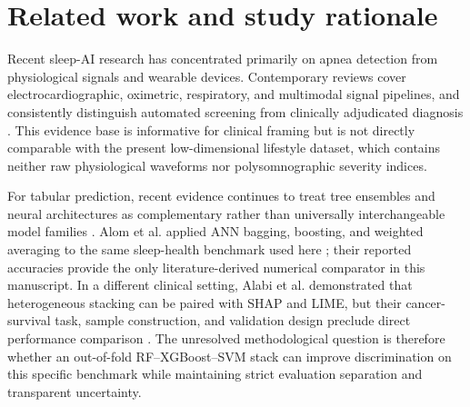 \documentclass{elektr}
\begin{document}
\section{Related work and study rationale}
Recent sleep-AI research has concentrated primarily on apnea detection from physiological signals and wearable devices. Contemporary reviews cover electrocardiographic, oximetric, respiratory, and multimodal signal pipelines, and consistently distinguish automated screening from clinically adjudicated diagnosis \cite{bazoukis2023,tyagi2023,abdalrazaq2024,giorgi2025}. This evidence base is informative for clinical framing but is not directly comparable with the present low-dimensional lifestyle dataset, which contains neither raw physiological waveforms nor polysomnographic severity indices.

For tabular prediction, recent evidence continues to treat tree ensembles and neural architectures as complementary rather than universally interchangeable model families \cite{borisov2024}. Alom et al. applied ANN bagging, boosting, and weighted averaging to the same sleep-health benchmark used here \cite{alom2024}; their reported accuracies provide the only literature-derived numerical comparator in this manuscript. In a different clinical setting, Alabi et al. demonstrated that heterogeneous stacking can be paired with SHAP and LIME, but their cancer-survival task, sample construction, and validation design preclude direct performance comparison \cite{alabi2023}. The unresolved methodological question is therefore whether an out-of-fold RF--XGBoost--SVM stack can improve discrimination on this specific benchmark while maintaining strict evaluation separation and transparent uncertainty.
\end{document}
